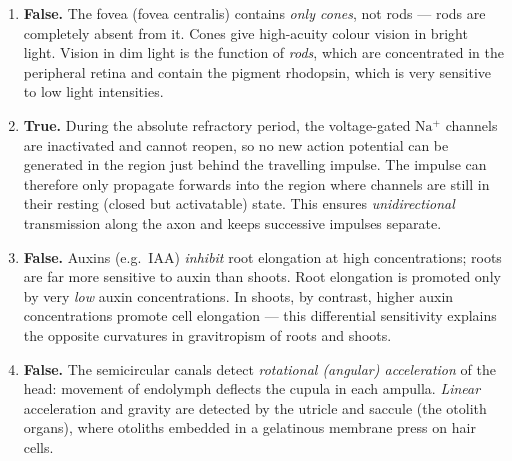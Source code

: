 \documentclass[11pt]{article}
\newcommand{\cle}[1]{{\popxbold\color{popdark}#1}}
\begin{document}
\begin{corrige}
\begin{enumerate}
\item \textbf{False.} The fovea (fovea centralis) contains \emph{only cones}, not rods — rods are completely absent from it. Cones give high-acuity colour vision in bright light. Vision in dim light is the function of \emph{rods}, which are concentrated in the peripheral retina and contain the pigment rhodopsin, which is very sensitive to low light intensities.

\item \textbf{True.} During the \cle{absolute refractory period}, the voltage-gated $\mathrm{Na^+}$ channels are inactivated and cannot reopen, so no new action potential can be generated in the region just behind the travelling impulse. The impulse can therefore only propagate forwards into the region where channels are still in their resting (closed but activatable) state. This ensures \emph{unidirectional} transmission along the axon and keeps successive impulses separate.

\item \textbf{False.} Auxins (e.g.\ IAA) \emph{inhibit} root elongation at high concentrations; roots are far more sensitive to auxin than shoots. Root elongation is promoted only by very \emph{low} auxin concentrations. In shoots, by contrast, higher auxin concentrations promote cell elongation — this differential sensitivity explains the opposite curvatures in gravitropism of roots and shoots.

\item \textbf{False.} The semicircular canals detect \emph{rotational (angular) acceleration} of the head: movement of endolymph deflects the cupula in each ampulla. \emph{Linear} acceleration and gravity are detected by the \cle{utricle and saccule} (the otolith organs), where otoliths embedded in a gelatinous membrane press on hair cells.
\end{enumerate}
\end{corrige}
\end{document}
